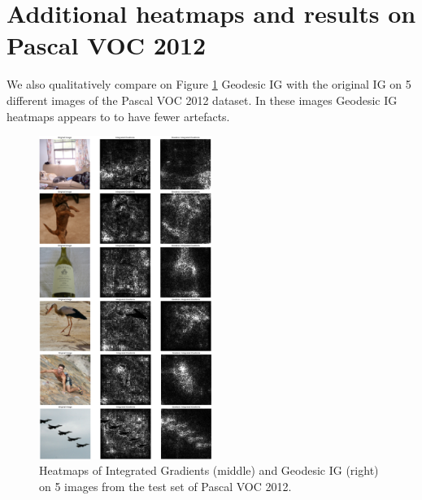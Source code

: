 
\section{Additional heatmaps and results on Pascal VOC 2012}
\label{app:voc}

We also qualitatively compare on Figure \ref{fig:more_images} Geodesic IG with the original IG on 5 different images of the Pascal VOC 2012 dataset. In these images Geodesic IG heatmaps appears to to have fewer artefacts.

\begin{figure}[ht]
\vskip 0.2in
\begin{center}
\centerline{\includegraphics[width=0.5\textwidth]{figures/more_images.png}}
\caption{Heatmaps of Integrated Gradients (middle) and Geodesic IG (right) on 5 images from the test set of Pascal VOC 2012.}
\label{fig:more_images}
\end{center}
\vskip -0.2in
\end{figure}
